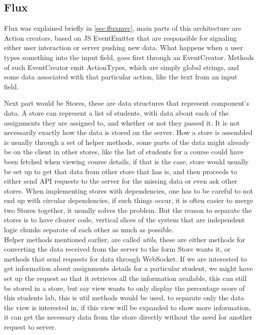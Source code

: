 \subsection{Flux}
Flux was explained briefly in \ref{sec:fluxmvc}, main parts of this architecture are Action creators, based on JS EventEmitter that are responsible for signaling either user interaction or server pushing new data. What happens when a user types something into the input field, goes first through an EventCreator. Methods of such EventCreator emit ActionTypes, which are simply global strings, and some data associated with that particular action, like the text from an input field.

Next part would be Stores, these are data structures that represent component's data. A store can represent a list of students, with data about each of the assignments they are assigned to, and whether or not they passed it. It is not necessarily exactly how the data is stored on the server. How a store is assembled is usually through a set of helper methods, some parts of the data might already be on the client in other stores, like the list of students for a course could have been fetched when viewing course details, if that is the case, store would usually be set up to get that data from other store that has is, and then proceeds to either send API requests to the server for the missing data or even ask other stores. When implementing stores with dependencies, one has to be careful to not end up with circular dependencies, if such things occur, it is often easier to merge two Stores together, it usually solves the problem. But the reason to separate the stores is to have clearer code, vertical slices of the system that are independent logic chunks separate of each other as much as possible.
\\Helper methods mentioned earlier, are called \emph{utils}, these are either methods for converting the data received from the server to the form Store wants it, or methods that send requests for data through WebSocket. If we are interested to get information about assignments details for a particular student, we might have set up the request so that it retrieves all the information available, this can still be stored in a store, but say view wants to only display the percentage score of this students lab, this is util methods would be used, to separate only the data the view is interested in, if this view will be expanded to show more information, it can get the necessary data from the store directly without the need for another request to server.
